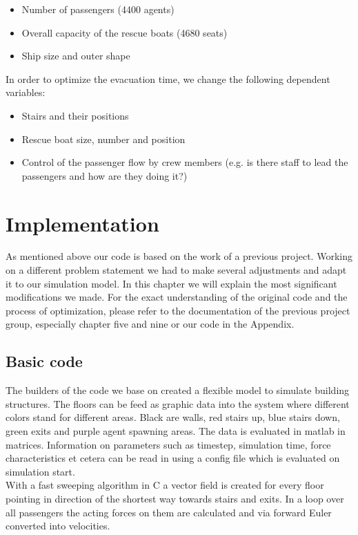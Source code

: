 \documentclass[11pt]{article}
\begin{document}
\begin{itemize}
\item Number of passengers (4400 agents)
\item Overall capacity of the rescue boats (4680 seats)
\item Ship size and outer shape
\end{itemize}

In order to optimize the evacuation time, we change the following dependent variables:
\begin{itemize}
\item Stairs and their positions
\item Rescue boat size, number and position
\item Control of the passenger flow by crew members (e.g. is there staff to lead the passengers and how are they doing it?)
\end{itemize}


\newpage
\section{Implementation}
As mentioned above our code is based on the work of a previous project. Working on a different problem statement we had to make several adjustments and adapt it to our simulation model. In this chapter we will explain the most significant modifications we made. For the exact understanding of the original code and the process of optimization, please refer to the documentation of the previous project group, especially chapter five and nine\cite{Building} or our code in the Appendix.

\subsection{Basic code}
The builders of the code we base on created a flexible model to simulate building structures. The floors can be feed as graphic data into the system where different colors stand for different areas. Black are walls, red stairs up, blue stairs down, green exits and purple agent spawning areas. The data is evaluated in matlab in matrices. Information on parameters such as timestep, simulation time, force characteristics et cetera can be read in using a config file which is evaluated on simulation start.\\
With a fast sweeping algorithm in C a vector field is created for every floor pointing in direction of the shortest way towards stairs and exits. In a loop over all passengers the acting forces on them are calculated and via forward Euler converted into velocities. 
\end{document}
